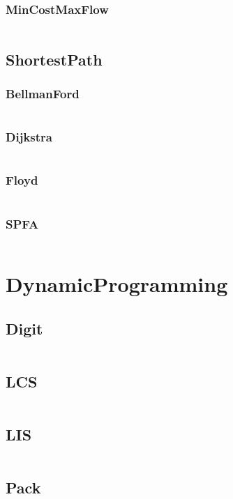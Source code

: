 \documentclass[a4paper,11pt]{article}
\begin{document}
\subsubsection{MinCostMaxFlow}
\inputminted[breaklines]{c++}{04++GraphTheory/+NetworkFlow/+MinCostMaxFlow.cpp}

\subsection{ShortestPath}
\subsubsection{BellmanFord}
\inputminted[breaklines]{c++}{04++GraphTheory/+ShortestPath/+BellmanFord.cpp}
\subsubsection{Dijkstra}
\inputminted[breaklines]{c++}{04++GraphTheory/+ShortestPath/+Dijkstra.cpp}
\subsubsection{Floyd}
\inputminted[breaklines]{c++}{04++GraphTheory/+ShortestPath/+Floyd.cpp}
\subsubsection{SPFA}
\inputminted[breaklines]{c++}{04++GraphTheory/+ShortestPath/+SPFA.cpp}


\newpage
\section{DynamicProgramming}
\subsection{Digit}
\inputminted[breaklines]{c++}{05++DynamicProgramming/+Digit.cpp}
\subsection{LCS}
\inputminted[breaklines]{c++}{05++DynamicProgramming/+LCS.cpp}
\subsection{LIS}
\inputminted[breaklines]{c++}{05++DynamicProgramming/+LIS.cpp}
\subsection{Pack}
\inputminted[breaklines]{c++}{05++DynamicProgramming/+Pack.cpp}
\end{document}
